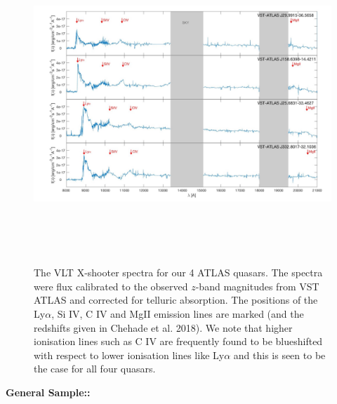 \hspace{-7.5cm}
\begin{figure}[h]
  \begin{center}
    \hspace{-0.5cm}
    \includegraphics[height=12.0cm,width=16.0cm]{XShooter_spectra_Chehade2018_Fig2.jpeg}
    \vspace{-10pt}
    \caption{\footnotesize  
      The VLT X-shooter spectra for our 4 ATLAS quasars. 
      The spectra
      were flux calibrated to the observed $z$-band magnitudes from VST ATLAS
      and corrected for telluric absorption. 
      The positions of the Ly$\alpha$, Si IV, C IV and MgII 
      emission lines are marked (and the redshifts given in Chehade et al. 2018). 
      We note that higher ionisation lines such as C IV
      are frequently found to be blueshifted with respect to lower ionisation
      lines like Ly$\alpha$ and this is seen to be the case for all four
      quasars.}
    \label{figtest-fig}
  \end{center}
\end{figure}

\smallskip
\smallskip
\noindent
{\bf General Sample::} \\

